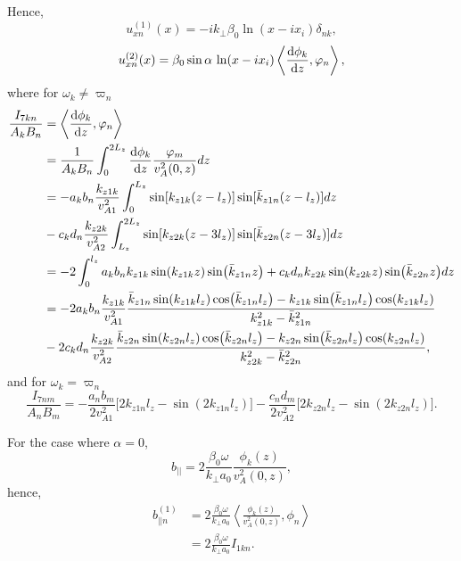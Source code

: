 \documentclass{article}
\begin{document}
Hence, 
\[u_{xn}^{(1)}(x) = -ik_\perp\beta_0\ln(x-ix_i)\delta_{nk},\]
\[
u_{xn}^{(2)}(x) = \beta_0\sin\alpha\,\ln(x-ix_i)\left\langle\dv{\phi_k}{z},\varphi_n\right\rangle,\]
where for $\omega_k\ne\varpi_n$
\[\begin{aligned}
\frac{I_{7kn}}{A_kB_n}&=\left\langle\dv{\phi_k}{z},\varphi_n\right\rangle \\
&= \frac{1}{A_kB_n}\int_0^{2L_z}\dv{\phi_k}{z}\frac{\varphi_m}{v_A^2(0,z)}dz \\
&= -a_kb_n \frac{k_{z1k}}{v_{A1}^2}\int_0^{L_z}\sin[k_{z1k}(z-l_z)]\sin[\bar{k}_{z1n}(z-l_z)] dz \\
&- c_kd_n\frac{k_{z2k}}{v_{A2}^2}\int_{L_z}^{2L_z}\sin[k_{z2k}(z-3l_z)]\sin[\bar{k}_{z2n}(z-3l_z)] dz \\
&=-2\int_{0}^{l_z}a_kb_nk_{z1k}\sin(k_{z1k}z)\sin(\bar{k}_{z1n}z) + c_kd_nk_{z2k}\sin(k_{z2k}z)\sin(\bar{k}_{z2n}z)dz \\
&=-2a_kb_n\frac{k_{z1k}}{v_{A1}^2}\frac{\bar{k}_{z1n}\sin(k_{z1k}l_z)\cos(\bar{k}_{z1n}l_z)-k_{z1k}\sin(\bar{k}_{z1n}l_z)\cos(k_{z1k}l_z)}{k_{z1k}^2-\bar{k}_{z1n}^2} \\
&-2c_kd_n\frac{k_{z2k}}{v_{A2}^2}\frac{\bar{k}_{z2n}\sin(k_{z2n}l_z)\cos(\bar{k}_{z2n}l_z)-k_{z2n}\sin(\bar{k}_{z2n}l_z)\cos(k_{z2n}l_z)}{k_{z2k}^2-\bar{k}_{z2n}^2}, \\
\end{aligned}\]
and for $\omega_k=\varpi_n$
\[\frac{I_{7nm}}{A_nB_m} = -\frac{a_nb_m}{2v_{A1}^2}\Big[2k_{z1n}l_z-\sin(2k_{z1n}l_z)\Big]-\frac{c_nd_m}{2v_{A2}^2}\Big[2k_{z2n}l_z-\sin(2k_{z2n}l_z)\Big].\]

For the case where $\alpha=0$,
\[b_{||}=2\frac{\beta_0\omega}{k_\perp a_0}\frac{\phi_k(z)}{v_A^2(0,z)},\]
hence,
\[\begin{aligned}
b_{||n}^{(1)} &= 2\frac{\beta_0\omega}{k_\perp a_0}\left\langle\frac{\phi_k(z)}{v_A^2(0,z)},\phi_n\right\rangle \\
&=2\frac{\beta_0\omega}{k_\perp a_0}I_{1kn}.
\end{aligned}\]
\end{document}
